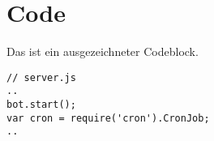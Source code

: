 \chapter{Code}
\label{ch:code}

Das ist ein ausgezeichneter Codeblock.

\begin{lstlisting}
// server.js
..
bot.start();
var cron = require('cron').CronJob;
..
\end{lstlisting}